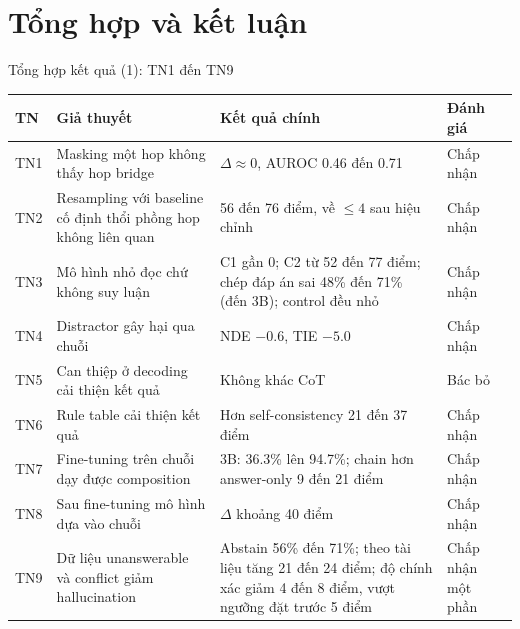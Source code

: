 \documentclass[aspectratio=169,t,10pt]{beamer}
\begin{document}
\section{Tổng hợp và kết luận}
\begin{frame}[shrink]{Tổng hợp kết quả (1): TN1 đến TN9}
\footnotesize
\renewcommand{\arraystretch}{1.18}
\begin{tabularx}{\textwidth}{@{}P{0.9cm}YP{4.8cm}P{1.6cm}@{}}
\toprule
\textbf{TN} & \textbf{Giả thuyết} & \textbf{Kết quả chính} & \textbf{Đánh giá}\\
\midrule
TN1 & Masking một hop không thấy hop bridge & $\Delta \approx 0$, AUROC 0.46 đến 0.71 & Chấp nhận\\
TN2 & Resampling với baseline cố định thổi phồng hop không liên quan & 56 đến 76 điểm, về $\le 4$ sau hiệu chỉnh & Chấp nhận\\
TN3 & Mô hình nhỏ đọc chứ không suy luận & C1 gần 0; C2 từ 52 đến 77 điểm; chép đáp án sai 48\% đến 71\% (đến 3B); control đều nhỏ & Chấp nhận\\
TN4 & Distractor gây hại qua chuỗi & NDE $-0.6$, TIE $-5.0$ & Chấp nhận\\
TN5 & Can thiệp ở decoding cải thiện kết quả & Không khác CoT & Bác bỏ\\
TN6 & Rule table cải thiện kết quả & Hơn self-consistency 21 đến 37 điểm & Chấp nhận\\
TN7 & Fine-tuning trên chuỗi dạy được composition & 3B: 36.3\% lên 94.7\%; chain hơn answer-only 9 đến 21 điểm & Chấp nhận\\
TN8 & Sau fine-tuning mô hình dựa vào chuỗi & $\Delta$ khoảng 40 điểm & Chấp nhận\\
TN9 & Dữ liệu unanswerable và conflict giảm hallucination & Abstain 56\% đến 71\%; theo tài liệu tăng 21 đến 24 điểm; độ chính xác giảm 4 đến 8 điểm, vượt ngưỡng đặt trước 5 điểm & Chấp nhận một phần\\
\bottomrule
\end{tabularx}
\end{frame}
\end{document}
